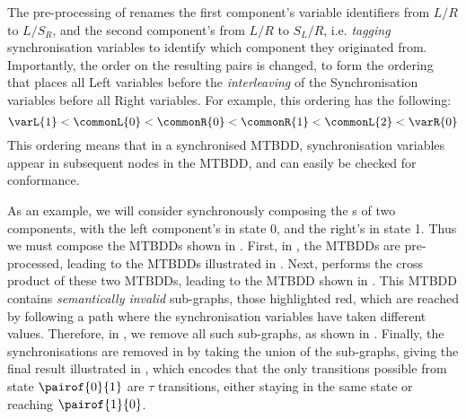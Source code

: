 The pre-processing of  renames the first component's variable
identifiers from $L/R$ to $L/S_R$, and the second component's from $L/R$ to
$S_L/R$, i.e. \emph{tagging} synchronisation variables to identify which
component they originated from. Importantly, the order on the resulting pairs
is changed, to form the ordering that places all Left variables before the
\emph{interleaving} of the Synchronisation variables before all Right
variables. For example, this ordering has the following:
\[
    \varL{1} < \commonL{0} < \commonR{0} < \commonR{1} < \commonL{2} < \varR{0}
\]
This ordering means that in a synchronised MTBDD, synchronisation variables
appear in subsequent nodes in the MTBDD, and can easily be checked for
conformance.

As an example, we will consider synchronously composing the \TNFA{}s of two \bufferC{}
components, with the left component's \TNFA{} in state 0, and
the right's in state 1. Thus we must compose the MTBDDs shown in
. First, in , the MTBDDs are
pre-processed, leading to the MTBDDs illustrated in
. Next,  performs the cross
product of these two MTBDDs, leading to the MTBDD shown in
. This MTBDD contains \emph{semantically invalid}
sub-graphs, those highlighted red, which are reached by following a path where
the synchronisation variables have taken different values. Therefore, in
, we remove all such sub-graphs, as shown in
. Finally, the synchronisations are removed in
 by taking the union of the sub-graphs, giving the final
result illustrated in , which encodes that the only
transitions possible from state $\pairof{0}{1}$ are $\tau$ transitions, either
staying in the same state or reaching $\pairof{1}{0}$.

